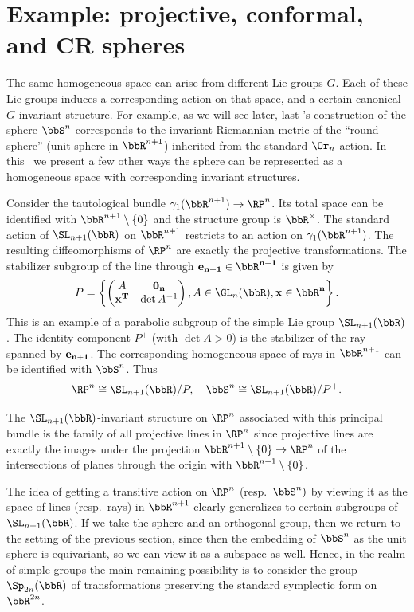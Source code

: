 \section{Example: projective, conformal, and CR spheres}\label{sec: projective, conformal CR spheres}

The same homogeneous space can arise from different Lie groups $G$. Each of these Lie groups induces a corresponding action on that space, and a certain canonical $G$-invariant structure. For example, as we will see later, last \sect's construction of the sphere $\bbS^n$ corresponds to the invariant Riemannian metric of the ``round sphere'' (unit sphere in $\bbR^{n+1}$) inherited from the standard $\Or_n$-action. In this \sect\ we present a few other ways the sphere can be represented as a homogeneous space with corresponding invariant structures.

\begin{defn}
    Consider the tautological bundle $\gamma_1(\bbR^{n+1})\to \RP^n$. Its total space can be identified with $\bbR^{n+1}\setminus\{0\}$ and the structure group is $\bbR^\times$. The standard action of $\SL_{n+1}(\bbR)$ on $\bbR^{n+1}$ restricts to an action on $\gamma_1(\bbR^{n+1})$. The resulting diffeomorphisms of $\RP^n$ are exactly the projective transformations. The stabilizer subgroup of the line through $\bf{e}_{n+1}\in\bbR^{n+1}$ is given by
    \[P=\left\{\begin{pmatrix}
        A&\bf{0}_n\\
        \bf{x}^T&\det A^{-1}\end{pmatrix}, A\in\GL_n(\bbR),\bf{x}\in\bbR^{n}\right\}.\]
    This is an example of a parabolic subgroup of the simple Lie group $\SL_{n+1}(\bbR)$. 
    The identity component $P^+$ (with $\det A>0$) is the stabilizer of the ray spanned by $\bf{e}_{n+1}$. The corresponding homogeneous space of rays in $\bbR^{n+1}$ can be identified with $\bbS^n$.
    Thus
    \[\RP^n\cong \SL_{n+1}(\bbR)\slash P,\quad \bbS^n\cong  \SL_{n+1}(\bbR)\slash P^+.\]
\end{defn}

The $\SL_{n+1}(\bbR)$-invariant structure on $\RP^n$ associated with this principal bundle is the family of all projective lines in $\RP^n$ since projective lines are exactly the images under the projection $\bbR^{n+1}\setminus\{0\}\to \RP^n$ of the intersections of planes through the origin with $\bbR^{n+1}\setminus\{0\}$.

The idea of getting a transitive action on $\RP^n$ (resp.~$\bbS^n)$ by viewing it as the space of lines (resp.~rays) in $\bbR^{n+1}$ clearly generalizes to certain subgroups of $\SL_{n+1}(\bbR)$. If we take the sphere and an orthogonal group, then we return to the setting of the previous section, since then the embedding of $\bbS^n$ as the unit sphere is equivariant, so we can view it as a subspace as well. Hence, in the realm of simple groups the main remaining possibility is to consider the group $\Sp_{2n}(\bbR)$ of transformations preserving the standard symplectic form on $\bbR^{2n}$.

